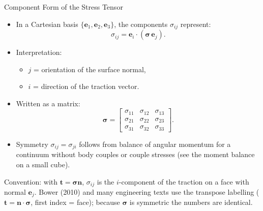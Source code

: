 \documentclass[aspectratio=169,11pt]{beamer}
\begin{document}
\begin{frame}{Component Form of the Stress Tensor}

\begin{itemize}

\item In a Cartesian basis $\{\mathbf{e}_1,\mathbf{e}_2,\mathbf{e}_3\}$,
the components $\sigma_{ij}$ represent:
\[
\sigma_{ij} = \mathbf{e}_i \cdot (\boldsymbol{\sigma} \,\mathbf{e}_j).
\]

\item Interpretation:
\begin{itemize}
  \item $j$ = orientation of the surface normal,
  \item $i$ = direction of the traction vector.
\end{itemize}

\item Written as a matrix:
\[
\boldsymbol{\sigma}
=
\begin{bmatrix}
\sigma_{11} & \sigma_{12} & \sigma_{13} \\
\sigma_{21} & \sigma_{22} & \sigma_{23} \\
\sigma_{31} & \sigma_{32} & \sigma_{33}
\end{bmatrix}.
\]

\item Symmetry \(\sigma_{ij}=\sigma_{ji}\) follows from balance of angular momentum for a continuum without body couples or couple stresses (see the moment balance on a small cube).
\end{itemize}

\vspace{1mm}
{\tiny\color{DarkGray}Convention: with $\mathbf{t}=\boldsymbol{\sigma}\mathbf{n}$, $\sigma_{ij}$ is the $i$-component of the traction on a face with normal $\mathbf{e}_j$. Bower (2010) and many engineering texts use the transpose labelling ($\mathbf{t}=\mathbf{n}\cdot\boldsymbol{\sigma}$, first index = face); because $\boldsymbol{\sigma}$ is symmetric the numbers are identical.\par}

\end{frame}
\end{document}
